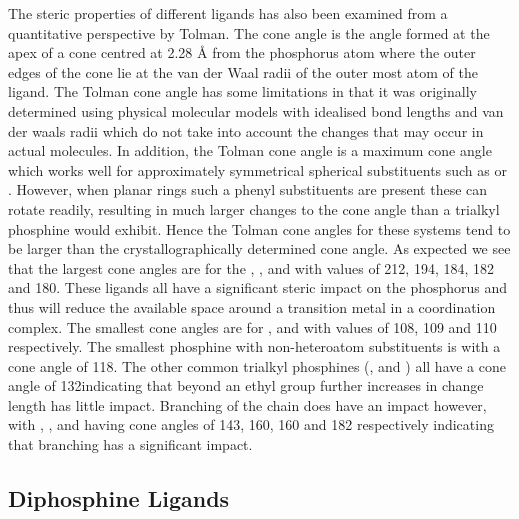 The steric properties of different ligands has also been examined from a quantitative perspective by Tolman.\cite{Tolman1977}  The cone angle is the angle formed at the apex of a cone centred at 2.28 \si{\angstrom} from the phosphorus atom where the outer edges of the cone lie at the van der Waal radii of the outer most atom of the ligand.  The Tolman cone angle has some limitations in that it was originally determined using physical molecular models with idealised bond lengths and van der waals radii which do not take into account the changes that may occur in actual molecules.  In addition, the Tolman cone angle is a maximum cone angle which works well for approximately symmetrical spherical substituents such as  or .  However, when planar rings such a phenyl substituents are present these can rotate readily, resulting in much larger changes to the cone angle than a trialkyl phosphine would exhibit.  Hence the Tolman cone angles for these systems tend to be larger than the crystallographically determined cone angle.  As expected we see that the largest cone angles are for the  , ,  and  with values of 212, 194, 184, 182 and 180\degrees.  These ligands all have a significant steric impact on the phosphorus and thus will reduce the available space around a transition metal in a coordination complex.   The smallest cone angles are for ,  and  with values of 108, 109 and 110\degrees{} respectively.  The smallest phosphine with non-heteroatom substituents is  with a cone angle of 118\degrees.  The other common trialkyl phosphines (,  and ) all have a cone angle of 132\degrees indicating that beyond an ethyl group further increases in change length has little impact.  Branching of the chain does have an impact however, with , ,  and  having cone angles of 143, 160, 160 and 182 respectively indicating that branching has a significant impact.  

\subsection{Diphosphine Ligands}

